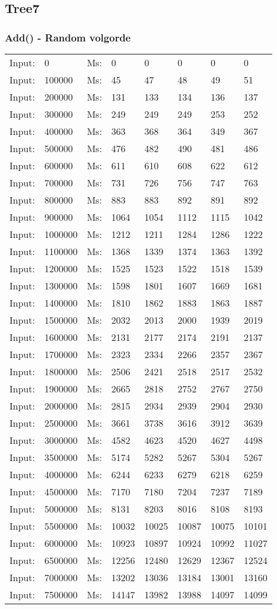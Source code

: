 \documentclass[11pt,a4paper]{report}
\begin{document}
\begin{tiny}
\subsection*{Tree7}
\subsubsection*{Add() - Random volgorde}
\begin{tabular}{l l ||l  l  l  l  l  l}
Input:&0&Ms:&0&0&0&0&0\\
Input:&100000&Ms:&45&47&48&49&51\\
Input:&200000&Ms:&131&133&134&136&137\\
Input:&300000&Ms:&249&249&249&253&252\\
Input:&400000&Ms:&363&368&364&349&367\\
Input:&500000&Ms:&476&482&490&481&486\\
Input:&600000&Ms:&611&610&608&622&612\\
Input:&700000&Ms:&731&726&756&747&763\\
Input:&800000&Ms:&883&883&892&891&892\\
Input:&900000&Ms:&1064&1054&1112&1115&1042\\
Input:&1000000&Ms:&1212&1211&1284&1286&1222\\
Input:&1100000&Ms:&1368&1339&1374&1363&1392\\
Input:&1200000&Ms:&1525&1523&1522&1518&1539\\
Input:&1300000&Ms:&1598&1801&1607&1669&1681\\
Input:&1400000&Ms:&1810&1862&1883&1863&1887\\
Input:&1500000&Ms:&2032&2013&2000&1939&2019\\
Input:&1600000&Ms:&2131&2177&2174&2191&2137\\
Input:&1700000&Ms:&2323&2334&2266&2357&2367\\
Input:&1800000&Ms:&2506&2421&2518&2517&2532\\
Input:&1900000&Ms:&2665&2818&2752&2767&2750\\
Input:&2000000&Ms:&2815&2934&2939&2904&2930\\
Input:&2500000&Ms:&3661&3738&3616&3912&3639\\
Input:&3000000&Ms:&4582&4623&4520&4627&4498\\
Input:&3500000&Ms:&5174&5282&5267&5304&5267\\
Input:&4000000&Ms:&6244&6233&6279&6218&6259\\
Input:&4500000&Ms:&7170&7180&7204&7237&7189\\
Input:&5000000&Ms:&8131&8203&8016&8108&8193\\
Input:&5500000&Ms:&10032&10025&10087&10075&10101\\
Input:&6000000&Ms:&10923&10897&10924&10992&11027\\
Input:&6500000&Ms:&12256&12480&12629&12367&12524\\
Input:&7000000&Ms:&13202&13036&13184&13001&13160\\
Input:&7500000&Ms:&14147&13982&13988&14097&14099\\
\end{tabular}
\\

\end{tiny}
\end{document}
